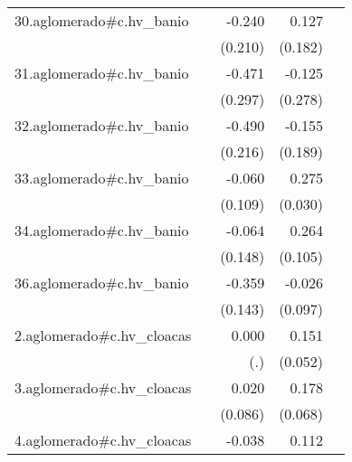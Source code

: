 {\begin{longtable}{l*{4}{D{.}{.}{-1}}}
\addlinespace
30.aglomerado#c.hv\_banio&                     &      -0.240         &       0.127         &                     \\
            &                     &     (0.210)         &     (0.182)         &                     \\
\addlinespace
31.aglomerado#c.hv\_banio&                     &      -0.471         &      -0.125         &                     \\
            &                     &     (0.297)         &     (0.278)         &                     \\
\addlinespace
32.aglomerado#c.hv\_banio&                     &      -0.490\sym{*}  &      -0.155         &                     \\
            &                     &     (0.216)         &     (0.189)         &                     \\
\addlinespace
33.aglomerado#c.hv\_banio&                     &      -0.060         &       0.275\sym{***}&                     \\
            &                     &     (0.109)         &     (0.030)         &                     \\
\addlinespace
34.aglomerado#c.hv\_banio&                     &      -0.064         &       0.264\sym{*}  &                     \\
            &                     &     (0.148)         &     (0.105)         &                     \\
\addlinespace
36.aglomerado#c.hv\_banio&                     &      -0.359\sym{*}  &      -0.026         &                     \\
            &                     &     (0.143)         &     (0.097)         &                     \\
\addlinespace
2.aglomerado#c.hv\_cloacas&                     &       0.000         &       0.151\sym{**} &                     \\
            &                     &         (.)         &     (0.052)         &                     \\
\addlinespace
3.aglomerado#c.hv\_cloacas&                     &       0.020         &       0.178\sym{**} &                     \\
            &                     &     (0.086)         &     (0.068)         &                     \\
\addlinespace
4.aglomerado#c.hv\_cloacas&                     &      -0.038         &       0.112\sym{**} &                     \\

\end{longtable}}
